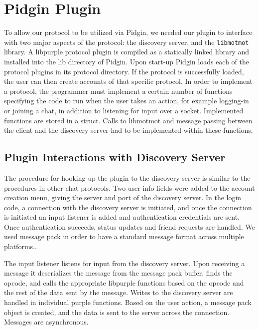 \documentclass{sig-alternate}
\newcommand\libmotmot{\texttt{libmotmot}\xspace}
\begin{document}

\section{Pidgin Plugin}

To allow our protocol to be utilized via Pidgin, we needed our plugin to
interface with two major aspects of the protocol: the discovery server, and the
\libmotmot library.
A libpurple protocol plugin is compiled as a statically linked library and installed into the lib directory
of Pidgin. Upon start-up Pidgin loads each of the protocol plugins in its protocol directory. If the protocol is successfully loaded, the user
can then create accounts of that specific protocol.
In order to implement a protocol, the programmer must implement a certain number of functions specifying the code to run when the user takes
an action, for example logging-in or joining a chat, in addition to listening
for input over a socket. Implemented functions are stored in a struct. Calls to libmotmot and message passing between the client and the discovery server had to be
implemented within these functions.

\subsection{Plugin Interactions with Discovery Server}
The procedure for hooking up the plugin to the discovery server is similar to the procedures in other chat protocols. Two user-info fields were
added to the account creation menu, giving the server and port of the discovery server. In the login code, a connection with the discovery server
is initiated, and once the connection is initiated an input listener is added and authentication credentials are sent. Once authentication succeeds,
status updates and friend requests are handled. We used message pack in order to have a standard message format across multiple platforms..

The input listener listens for input from the discovery server. Upon receiving a message it deserializes the message from the message pack buffer, finds
the opcode, and calls the appropriate libpurple functions based on the opcode and the rest of the data sent by the message. Writes to the discovery server
are handled in individual purple functions. Based on the user action, a message pack object is created, and the data is sent to the server across
the connection. Messages are asynchronous.

\end{document}

